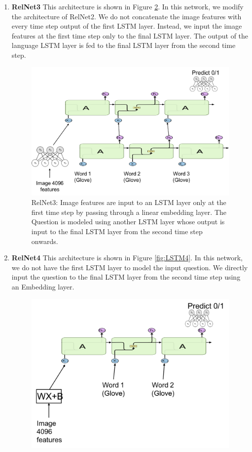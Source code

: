\begin{enumerate}
\begin{enumerate}
\begin{figure}[t]
\label{fig:LSTM2}
\end{figure}
\item \textbf{RelNet3} This architecture is shown in Figure \ref{fig:LSTM3}. In this network, we modify the architecture of RelNet2. We do not concatenate the image features with every time step output of the first LSTM layer. Instead, we input the image features at the first time step only to the final LSTM layer. The output of the language LSTM layer is fed to the final LSTM layer from the second time step.
\begin{figure}[t]
\begin{center}
  \includegraphics[width=0.8\linewidth]{images/lstm_p2_2}
\end{center}
   \caption{RelNet3: Image features are input to an LSTM layer only at the first time step by passing through a linear embedding layer. The Question is modeled using another LSTM layer whose output is input to the final LSTM layer from the second time step onwards.}
\label{fig:LSTM3}
\end{figure}
\item \textbf{RelNet4} This architecture is shown in Figure \ref{fig:LSTM4}. In this network, we do not have the first LSTM layer to model the input question. We directly input the question to the final LSTM layer from the second time step using an Embedding layer.
\begin{figure}[t]
\begin{center}
  \includegraphics[width=0.8\linewidth]{images/lstm_p2}

\end{center}
\end{figure}
\end{enumerate}
\end{enumerate}
